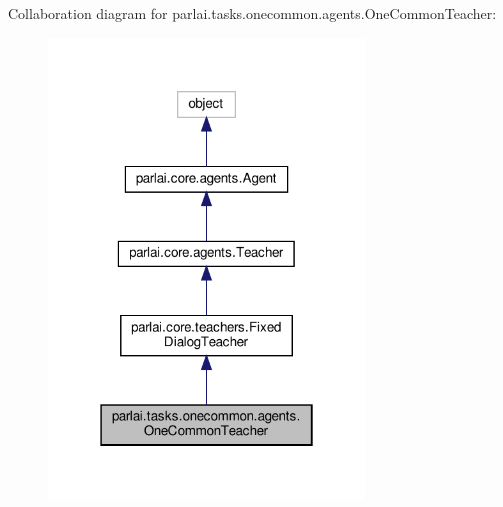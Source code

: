 Collaboration diagram for parlai.\+tasks.\+onecommon.\+agents.\+One\+Common\+Teacher\+:
\nopagebreak
\begin{figure}[H]
\begin{center}
\leavevmode
\includegraphics[width=238pt]{d8/d37/classparlai_1_1tasks_1_1onecommon_1_1agents_1_1OneCommonTeacher__coll__graph}
\end{center}
\end{figure}
